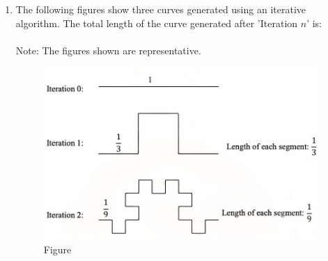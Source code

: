 \documentclass[journal,12pt,onecolumn]{IEEEtran}
\theoremstyle{remark}
\begin{document}
\begin{enumerate}
\item The following figures show three curves generated using an iterative algorithm. The total length of the curve generated after 'Iteration $n$' is:\\
\\
Note: The figures shown are representative.\\
\begin{figure}[H]
    \centering
    \includegraphics[width=0.6\columnwidth]{figs/fig1.png}
    \caption{Figure}
    \label{figs:fig1}
\end{figure}


\end{enumerate}
\end{document}
